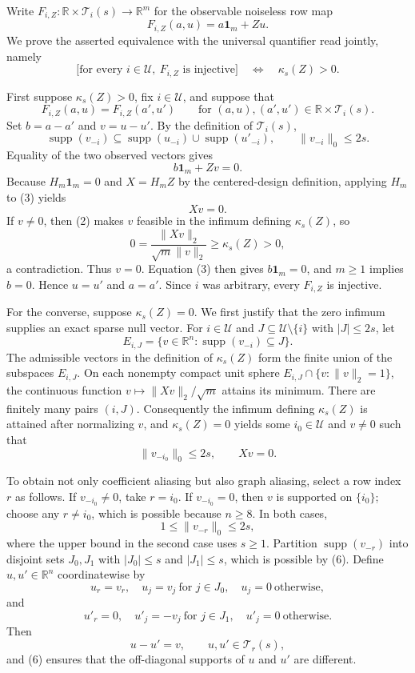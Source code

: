 Write \(F_{i,Z}:\mathbb R\times\mathcal T_i(s)\to\mathbb R^m\) for the observable noiseless row map
\[
F_{i,Z}(a,u)=a\mathbf 1_m+Zu.
\]
We prove the asserted equivalence with the universal quantifier read jointly, namely
\[
\bigl[\text{for every }i\in\mathcal U,\ F_{i,Z}\text{ is injective}\bigr]
\quad\Longleftrightarrow\quad \kappa_s(Z)>0. \tag{1}
\]

First suppose \(\kappa_s(Z)>0\), fix \(i\in\mathcal U\), and suppose that
\[
F_{i,Z}(a,u)=F_{i,Z}(a',u')
\qquad
\text{for }(a,u),(a',u')\in\mathbb R\times\mathcal T_i(s).
\]
Set \(b=a-a'\) and \(v=u-u'\).  By the definition of \(\mathcal T_i(s)\),
\[
\operatorname{supp}(v_{-i})
 \subseteq \operatorname{supp}(u_{-i})\cup\operatorname{supp}(u'_{-i}),
\qquad
\lVert v_{-i}\rVert_0\le 2s. \tag{2}
\]
Equality of the two observed vectors gives
\[
b\mathbf 1_m+Zv=0. \tag{3}
\]
Because \(H_m\mathbf 1_m=0\) and \(X=H_mZ\) by the centered-design definition, applying \(H_m\) to (3) yields
\[
Xv=0. \tag{4}
\]
If \(v\ne0\), then (2) makes \(v\) feasible in the infimum defining \(\kappa_s(Z)\), so
\[
0=\frac{\lVert Xv\rVert_2}{\sqrt m\lVert v\rVert_2}
 \ge \kappa_s(Z)>0,
\]
a contradiction.  Thus \(v=0\).  Equation (3) then gives \(b\mathbf 1_m=0\), and \(m\ge1\) implies \(b=0\).  Hence \(u=u'\) and \(a=a'\).  Since \(i\) was arbitrary, every \(F_{i,Z}\) is injective.

For the converse, suppose \(\kappa_s(Z)=0\).  We first justify that the zero infimum supplies an exact sparse null vector.  For \(i\in\mathcal U\) and \(J\subseteq\mathcal U\setminus\{i\}\) with \(\lvert J\rvert\le2s\), let
\[
E_{i,J}=\{v\in\mathbb R^n:\operatorname{supp}(v_{-i})\subseteq J\}.
\]
The admissible vectors in the definition of \(\kappa_s(Z)\) form the finite union of the subspaces \(E_{i,J}\).  On each nonempty compact unit sphere
\(E_{i,J}\cap\{v:\lVert v\rVert_2=1\}\), the continuous function \(v\mapsto\lVert Xv\rVert_2/\sqrt m\) attains its minimum.  There are finitely many pairs \((i,J)\).  Consequently the infimum defining \(\kappa_s(Z)\) is attained after normalizing \(v\), and \(\kappa_s(Z)=0\) yields some \(i_0\in\mathcal U\) and \(v\ne0\) such that
\[
\lVert v_{-i_0}\rVert_0\le2s,
\qquad Xv=0. \tag{5}
\]

To obtain not only coefficient aliasing but also graph aliasing, select a row index \(r\) as follows.  If \(v_{-i_0}\ne0\), take \(r=i_0\).  If \(v_{-i_0}=0\), then \(v\) is supported on \(\{i_0\}\); choose any \(r\ne i_0\), which is possible because \(n\ge8\).  In both cases,
\[
1\le\lVert v_{-r}\rVert_0\le2s, \tag{6}
\]
where the upper bound in the second case uses \(s\ge1\).  Partition \(\operatorname{supp}(v_{-r})\) into disjoint sets \(J_0,J_1\) with \(\lvert J_0\rvert\le s\) and \(\lvert J_1\rvert\le s\), which is possible by (6).  Define \(u,u'\in\mathbb R^n\) coordinatewise by
\[
u_r=v_r,
\quad u_j=v_j\ \text{for }j\in J_0,
\quad u_j=0\ \text{otherwise},
\]
and
\[
u'_r=0,
\quad u'_j=-v_j\ \text{for }j\in J_1,
\quad u'_j=0\ \text{otherwise}.
\]
Then
\[
u-u'=v,
\qquad u,u'\in\mathcal T_r(s), \tag{7}
\]
and (6) ensures that the off-diagonal supports of \(u\) and \(u'\) are different.


